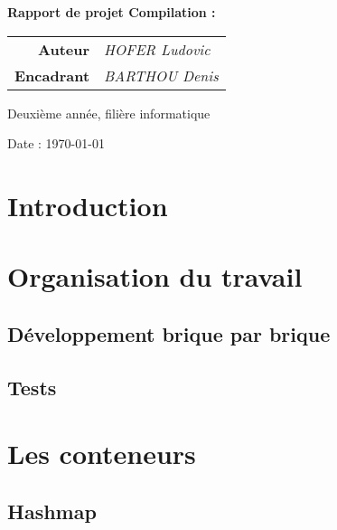 \documentclass[12pt]{article}
\begin{document}
\thispagestyle{empty}


\begin{center}
	\Huge{\textbf{Rapport de projet Compilation :}}
\end{center}


\begin{tabular}{r@{:~}l}
	\textbf{Auteur} & \textit{HOFER Ludovic}\\
 \textbf{Encadrant} & \textit{BARTHOU Denis}\\
\end{tabular}


\begin{center}Deuxième année, filière informatique

	Date : \today
\end{center}

\newpage

\section{Introduction}

\section{Organisation du travail}

\subsection{Développement brique par brique}

\subsection{Tests}

\section{Les conteneurs}

\subsection{Hashmap}
\end{document}

